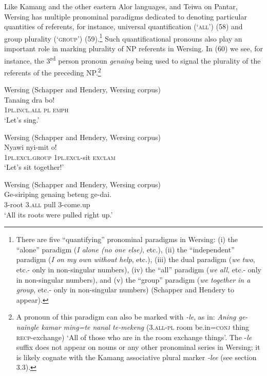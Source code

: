 Like Kamang and the other eastern Alor languages, and Teiwa on Pantar, Wersing has multiple pronominal paradigms dedicated to denoting particular quantities of referents, for instance, universal quantification (`\textsc{all')} (58) and group plurality (`\textsc{group}') (59).\footnote{  There are five ``quantifying'' pronominal paradigms in Wersing: (i) the ``alone'' paradigm (\textit{I alone (no one else)}, etc.), (ii) the ``independent'' paradigm (\textit{I on my own without help}, etc.), (iii) the dual paradigm (\textit{we} \textit{two}, etc.- only in non-singular numbers), (iv) the ``all'' paradigm (\textit{we} \textit{all}, etc.- only in non-singular numbers), and (v) the ``group'' paradigm (\textit{we together in a group}, etc.- only in non-singular numbers) (Schapper and Hendery to appear).} Such quantificational pronouns also play an important role in marking plurality of NP referents in Wersing. In (60) we see, for instance, the 3\textsuperscript{rd} person pronoun \textit{genaing} being
used to signal the plurality of the referents of the preceding NP.\footnote{  A pronoun of this paradigm can also be marked with \textit{-le}, as in: \textit{Aning ge-naingle kamar ming=te nanal te-mekeng} (\textsc{3.all-pl} room be.in=\textsc{conj} thing \textsc{recp}-exchange) `All of those who are in the room exchange things'. The -\textit{le} suffix does not appear on nouns or any other pronominal series in Wersing; it is likely cognate with the Kamang associative plural marker \textit{-lee} (see section 3.3).}


\ea%
\label{ex:58}
Wersing (Schapper and Hendery, Wersing corpus)\\
\gll  Tanaing dra bo! \\
   \textsc{1pl.incl.all} \textsc{pl}   \textsc{emph}  \\
\glt `Let's sing.'
\z







\ea%
\label{ex:59}
Wersing (Schapper  and Hendery, Wersing corpus)\\
\gll  Nyawi nyi-mit o! \\
   \textsc{1pl.excl.}\textsc{group} \textsc{1pl.excl}-sit \textsc{exclam}  \\
\glt `Let's sit together!'
\z







\ea%
\label{ex:60}
Wersing (Schapper  and Hendery, Wersing corpus)\\
\gll  Ge-siriping genaing beteng ge-dai. \\
 \textsc{3-}root \textsc{3.all}   pull 3-come.up    \\
\glt `All its roots were pulled right up.'
\z





